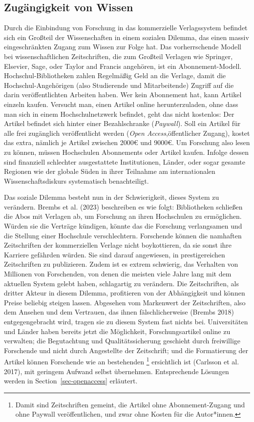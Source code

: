 \documentclass[
  letterpaper,
  DIV=11,
  numbers=noendperiod]{scrreprt}
\begin{document}
\subsection{Zugängigkeit von Wissen}\label{zuguxe4ngigkeit-von-wissen}

Durch die Einbindung von Forschung in das kommerzielle Verlagssystem
befindet sich ein Großteil der Wissenschaften in einem sozialen Dilemma,
das einen massiv eingeschränkten Zugang zum Wissen zur Folge hat. Das
vorherrschende Modell bei wissenschaftlichen Zeitschriften, die zum
Großteil Verlagen wie Springer, Elsevier, Sage, oder Taylor and Francis
angehören, ist ein Abonnement-Modell. Hochschul-Bibliotheken zahlen
Regelmäßig Geld an die Verlage, damit die Hochschul-Angehörigen (also
Studierende und Mitarbeitende) Zugriff auf die darin veröffentlichten
Arbeiten haben. Wer kein Abonnement hat, kann Artikel einzeln kaufen.
Versucht man, einen Artikel online herunterzuladen, ohne dass man sich
in einem Hochschulnetzwerk befindet, geht das nicht kostenlos: Der
Artikel befindet sich hinter einer Bezahlschranke (\emph{Paywall}). Soll
ein Artikel für alle frei zugänglich veröffentlicht werden (\emph{Open
Access},öffentlicher Zugang), kostet das extra, nämlich je Artikel
zwischen 2000€ und 9000€. Um Forschung also lesen zu können, müssen
Hochschulen Abonnements oder Artikel kaufen. Infolge dessen sind
finanziell schlechter ausgestattete Institutionen, Länder, oder sogar
gesamte Regionen wie der globale Süden in ihrer Teilnahme am
internationalen Wissenschaftsdiskurs systematisch benachteiligt.

Das soziale Dilemma besteht nun in der Schwierigkeit, dieses System zu
verändern. Brembs et al. (2023) beschreiben es wie folgt: Bibliotheken
schließen die Abos mit Verlagen ab, um Forschung an ihren Hochschulen zu
ermöglichen. Würden sie die Verträge kündigen, könnte das die Forschung
verlangsamen und die Stellung einer Hochschule verschlechtern.
Forschende können die namhaften Zeitschriften der kommerziellen Verlage
nicht boykottieren, da sie sonst ihre Karriere gefährden würden. Sie
sind darauf angewiesen, in prestigereichen Zeitschriften zu publizieren.
Zudem ist es extrem schwierig, das Verhalten von Millionen von
Forschenden, von denen die meisten viele Jahre lang mit dem aktuellen
System gelebt haben, schlagartig zu verändern. Die Zeitschriften, als
dritter Akteur in diesem Dilemma, profitieren von der Abhängigkeit und
können Preise beliebig steigen lassen. Abgesehen vom Markenwert der
Zeitschriften, also dem Ansehen und dem Vertrauen, das ihnen
fälschlicherweise (Brembs 2018) entgegengebracht wird, tragen sie zu
diesem System fast nichts bei. Universitäten und Länder haben bereits
jetzt die Möglichkeit, Forschungsartikel online zu verwalten; die
Begutachtung und Qualitätssicherung geschieht durch freiwillige
Forschende und nicht durch Angestellte der Zeitschrift; und die
Formatierung der Artikel können Forschende wie an bestehenden
\footnote{Damit sind Zeitschriften gemeint, die Artikel ohne
  Abonnement-Zugang und ohne Paywall veröffentlichen, und zwar ohne
  Kosten für die Autor*innen.} ersichtlich ist (Carlsson et al. 2017),
mit geringem Aufwand selbst übernehmen. Entsprechende Lösungen werden in
Section~\ref{sec-openaccess} erläutert.
\end{document}
